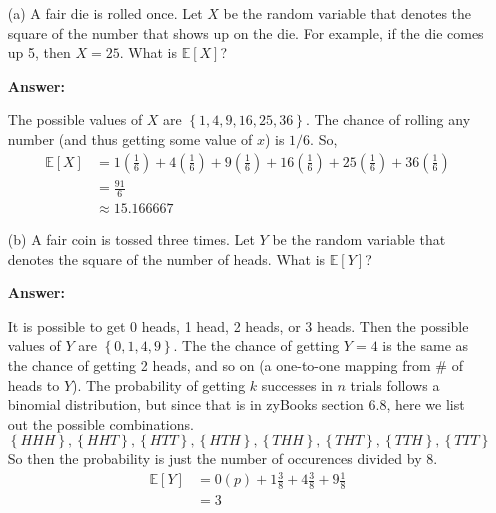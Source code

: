 \documentclass[14pt]{extreport}
\newcommand{\answer}[0]{\medskip \textbf{Answer:} \medskip}
\newcommand{\E}[0]{\mathbb{E}}
\begin{document}
\begin{enumerate}
    
    \item[(a)] A fair die is rolled once. Let \( X \) be the random variable that denotes the square of the number that shows up on the die. For example, if the die comes up 5, then \( X = 25 \). What is \( \mathbb{E}[X] \)?
    
        \answer

        The possible values of \( X \) are \( \left\{ 1, 4, 9, 16, 25, 36 \right\} \). The chance of rolling any number (and thus getting some value of \( x \)) is \( 1 / 6 \). So,
        \begin{align*}
            \mathbb{E}[X] &= 1(\frac{1}{6}) + 4(\frac{1}{6}) + 9(\frac{1}{6}) + 16(\frac{1}{6}) + 25(\frac{1}{6}) + 36(\frac{1}{6}) \\
                 &= \frac{91}{6} \\
                 &\approx 15.166667
        \end{align*}

    \item[(b)] A fair coin is tossed three times. Let \( Y \) be the random variable that denotes the square of the number of heads. What is \( \mathbb{E}[Y] \)?
    
        \answer

        It is possible to get 0 heads, 1 head, 2 heads, or 3 heads. Then the possible values of \( Y \) are \( \left\{ 0, 1, 4, 9 \right\} \). The the chance of getting \( Y = 4 \) is the same as the chance of getting 2 heads, and so on (a one-to-one mapping from \# of heads to \( Y \)). The probability of getting \( k \) successes in \( n \) trials follows a binomial distribution, but since that is in zyBooks section 6.8, here we list out the possible combinations.
        \[
            \left\{ HHH \right\},
            \left\{ HHT \right\},
            \left\{ HTT \right\},
            \left\{ HTH \right\},
            \left\{ THH \right\},
            \left\{ THT \right\},
            \left\{ TTH \right\},
            \left\{ TTT \right\}
        \]
        So then the probability is just the number of occurences divided by 8.
        \begin{align*}
            \E[Y] &= 0(p) + 1 \frac{3}{8} + 4 \frac{3}{8} + 9 \frac{1}{8} \\
                  &= 3
        \end{align*}

\end{enumerate}
\end{document}

